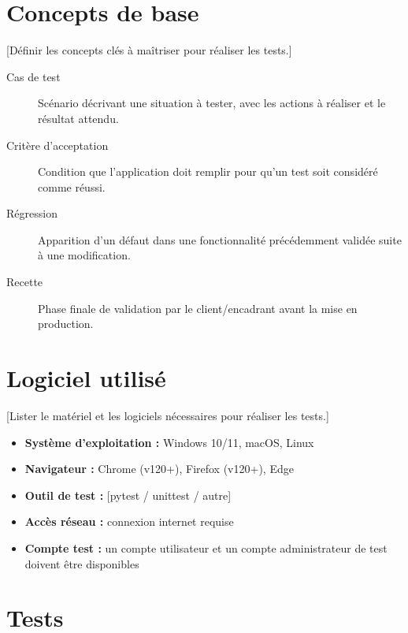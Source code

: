 \documentclass[12pt, a4paper]{article}
\begin{document}
\section{Concepts de base}

[Définir les concepts clés à maîtriser pour réaliser les tests.]

\begin{description}
  \item[Cas de test] Scénario décrivant une situation à tester, avec les
    actions à réaliser et le résultat attendu.
  \item[Critère d'acceptation] Condition que l'application doit remplir pour
    qu'un test soit considéré comme réussi.
  \item[Régression] Apparition d'un défaut dans une fonctionnalité
    précédemment validée suite à une modification.
  \item[Recette] Phase finale de validation par le client/encadrant avant
    la mise en production.
\end{description}

\section{Logiciel utilisé}

[Lister le matériel et les logiciels nécessaires pour réaliser les tests.]

\begin{itemize}
  \item \textbf{Système d'exploitation :} Windows 10/11, macOS, Linux
  \item \textbf{Navigateur :} Chrome (v120+), Firefox (v120+), Edge
  \item \textbf{Outil de test :} [pytest / unittest / autre]
  \item \textbf{Accès réseau :} connexion internet requise
  \item \textbf{Compte test :} un compte utilisateur et un compte administrateur
    de test doivent être disponibles
\end{itemize}

\section{Tests}
\end{document}
